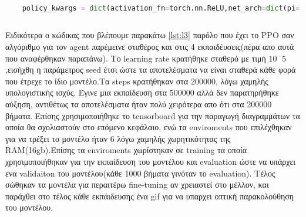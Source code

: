 \begin{lstlisting}[language=Python, caption=Neural Network,label={lst:l2}]

 	policy_kwargs = dict(activation_fn=torch.nn.ReLU,net_arch=dict(pi=[128, 64,32], vf=[128, 64,32]))
	
\end{lstlisting}
\clearpage

Ειδικότερα ο κώδικας που βλέπουμε παρακάτω \ref{lst:l3} παρόλο που έχει το PPO σαν αλγόριθμο για τον agent παρέμεινε σταθέρος και στις 4 εκπαιδέυσεις(πέρα απο αυτά που αναφέρθηκαν παραπάνω). Το learning rate κρατήθηκε σταθερό με τιμή  $10^-5$,εισήχθη η παράμετρος seed έτσι ώστε τα αποτελέσματα να είναι σταθερά κάθε φορά που έτρεχε το ίδιο μοντέλο.Tα steps κρατήθηκαν στα 200000, λόγω χαμηλής υπολογιστικής ισχύς. Έγινε μια εκπαίδευση στα 500000 αλλά δεν παρατηρήθηκε αύξηση, αντιθέτως τα αποτελέσματα ήταν πολύ χειρότερα απο ότι στα 200000 βήματα. Eπίσης χρησιμοποιήθηκε το tensorboard για την παραγωγή διαγραμμάτων τα οποία θα σχολιαστούν στο επόμενο κεφάλαιο, ενώ τα enviroments που επιλέχθηκαν για να τρέξει το μοντέλο ήταν 6 λόγω χαμηλής χωρητικότητας της RAM(16gb).Επίσης τα enviroments χωρίστηκαν σε training τα οποία χρησιμοποιήθηκαν για την εκπαίδευση του μοντέλου και evaluation ώστε να υπάρχει ενα validaiton του μοντέλου(κάθε 1000 βήματα γινόταν το evaluation). Τέλος σώθηκαν τα μοντέλα για περαιτέρω fine-tuning αν χρειαστεί στο μέλλον, και παράχθει στο τέλος κάθε εκπάιδευσης ένα gif για να υπαρχει οπτική παρακολούθηση του μοντέλου.



